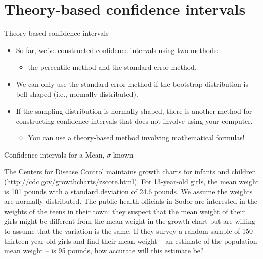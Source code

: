 \documentclass[
  ignorenonframetext,
]{beamer}
\providecommand{\tightlist}{%
  \setlength{\itemsep}{0pt}\setlength{\parskip}{0pt}}
\begin{document}
\section{Theory-based confidence
intervals}\label{theory-based-confidence-intervals}

\begin{frame}{Theory-based confidence intervals}
\label{theory-based-confidence-intervals-1}
\begin{itemize}
\item
  So far, we've constructed confidence intervals using two methods:

  \begin{itemize}
  \tightlist
  \item
    the percentile method and the standard error method.
  \end{itemize}
\item
  We can only use the standard-error method if the bootstrap
  distribution is bell-shaped (i.e., normally distributed).
\item
  If the sampling distribution is normally shaped, there is another
  method for constructing confidence intervals that does not involve
  using your computer.

  \begin{itemize}
  \tightlist
  \item
    You can use a theory-based method involving mathematical formulas!
  \end{itemize}
\end{itemize}
\end{frame}

\begin{frame}{Confidence intervals for a Mean, \(\sigma\) known}
\label{confidence-intervals-for-a-mean-sigma-known}
\begin{tcolorbox}
The Centers for Disease Control maintains growth charts for infants and children (http://cdc.gov/growthcharts/zscore.html). For 13-year-old girls, the mean weight is 101 pounds with a standard deviation of 24.6 pounds. We assume the weights are normally distributed. The public health officials in Sodor are interested in the weights of the teens in their town: they suspect that the mean weight of their girls might be different from the mean weight in the growth chart but are willing to assume that the variation is the same. If they survey a random sample of 150 thirteen-year-old girls and find their mean weight – an estimate of the population mean weight – is 95 pounds, how accurate will this estimate be?
\end{tcolorbox}
\end{frame}
\end{document}
